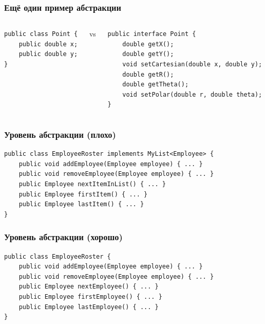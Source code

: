 \documentclass[xetex,mathserif,serif]{beamer}
\begin{document}
	\begin{frame}[fragile]
		\frametitle{Ещё один пример абстракции}
		\begin{columns}
			\begin{column}{0.32\textwidth}
				\begin{verbatim}
public class Point {
    public double x;
    public double y;
}
				\end{verbatim}
			\end{column}
			\begin{column}{0.05\textwidth}
				vs
			\end{column}
			\begin{column}{0.6\textwidth}
				\begin{verbatim}
public interface Point {
    double getX();
    double getY();
    void setCartesian(double x, double y);
    double getR();
    double getTheta();
    void setPolar(double r, double theta);
}
				\end{verbatim}
			\end{column}
		\end{columns}
	\end{frame}

	\begin{frame}[fragile]
		\frametitle{Уровень абстракции (плохо)}
		\begin{verbatim}
public class EmployeeRoster implements MyList<Employee> {
    public void addEmployee(Employee employee) { ... }
    public void removeEmployee(Employee employee) { ... }
    public Employee nextItemInList() { ... }
    public Employee firstItem() { ... }
    public Employee lastItem() { ... }
}
		\end{verbatim}
	\end{frame}

	\begin{frame}[fragile]
		\frametitle{Уровень абстракции (хорошо)}
		\begin{verbatim}
public class EmployeeRoster {
    public void addEmployee(Employee employee) { ... }
    public void removeEmployee(Employee employee) { ... }
    public Employee nextEmployee() { ... }
    public Employee firstEmployee() { ... }
    public Employee lastEmployee() { ... }
}
		\end{verbatim}
	\end{frame}
\end{document}
